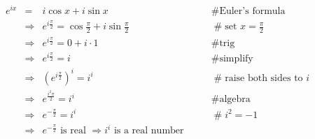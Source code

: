 \documentclass[11pt, oneside]{article}   	%
\begin{document}
    
\begin{equation*}
\begin{array}{lllll}
e^{ix}
&=& i \cos x + i \sin x                                                                                     &\qquad  \mathrel{\#} \text{Euler's formula}           \\ 
&\Rightarrow& e^{i \frac{\pi}{2}}  = \cos \frac{\pi}{2} + i \sin \frac{\pi}{2}        &\qquad  \mathrel{\#} \text{set $x = \frac{\pi}{2}$}  \\
&\Rightarrow& e^{i \frac{\pi}{2}}  = 0 +  i \cdot 1                                           &\qquad  \mathrel{\#} \text{trig}                               \\
&\Rightarrow& e^{i \frac{\pi}{2}}  =  i                                                             &\qquad  \mathrel{\#} \text{simplify}                               \\
&\Rightarrow& (e^{i \frac{\pi}{2}})^i =  i^i                                                       &\qquad  \mathrel{\#} \text{raise both sides to $i$}  \\
&\Rightarrow& e^{\frac{i^2 \pi}{2}} =  i^i                                                        &\qquad  \mathrel{\#} \text{algebra}                         \\
&\Rightarrow& e^{- \frac {\pi}{2}} =  i^i                                                          &\qquad  \mathrel{\#} i^2 = -1                                   \\
&\Rightarrow& e^{- \frac {\pi}{2}} \text{ is real $\Rightarrow i^i$ is a real number}
                                                        
                                                        
                                                      
\end{array}
\end{equation*}
\end{document}
